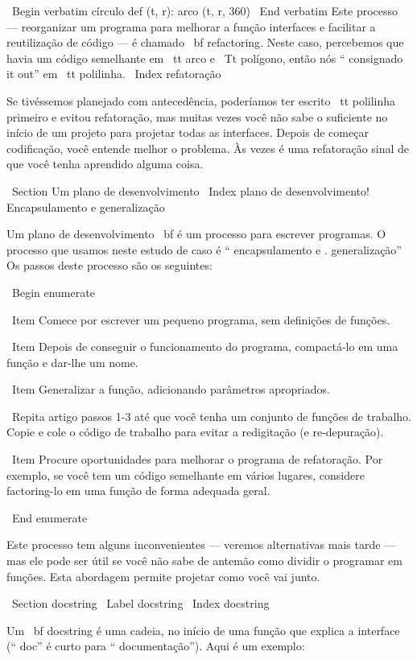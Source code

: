 \documentclass[10pt]{book}
\begin{document}
{\ Begin {verbatim}
círculo def (t, r):
    arco (t, r, 360)
\ End {verbatim}
%
Este processo --- reorganizar um programa para melhorar a função
interfaces e facilitar a reutilização de código --- é chamado {\ bf refactoring}.
Neste caso, percebemos que havia um código semelhante em {\ tt arco} e
{\ Tt polígono}, então nós `` consignado it out'' em {\ tt polilinha}.
\ Index {} refatoração

Se tivéssemos planejado com antecedência, poderíamos ter escrito {\ tt polilinha} primeiro
e evitou refatoração, mas muitas vezes você não sabe o suficiente no
início de um projeto para projetar todas as interfaces. Depois de começar
codificação, você entende melhor o problema. Às vezes é uma refatoração
sinal de que você tenha aprendido alguma coisa.


\ Section {Um plano de desenvolvimento}
\ Index {plano de desenvolvimento! Encapsulamento e generalização}

Um plano de desenvolvimento {\ bf} é um processo para escrever programas.
O processo que usamos
neste estudo de caso é `` encapsulamento e
. generalização'' Os passos deste processo são os seguintes:

\ Begin {enumerate}

\ Item Comece por escrever um pequeno programa, sem definições de funções.

\ Item Depois de conseguir o funcionamento do programa, compactá-lo em uma função
e dar-lhe um nome.

\ Item Generalizar a função, adicionando parâmetros apropriados.

\ Repita artigo passos 1-3 até que você tenha um conjunto de funções de trabalho.
Copie e cole o código de trabalho para evitar a redigitação (e re-depuração).

\ Item Procure oportunidades para melhorar o programa de refatoração.
Por exemplo, se você tem um código semelhante em vários lugares, considere
factoring-lo em uma função de forma adequada geral.

\ End {enumerate}

Este processo tem alguns inconvenientes --- veremos alternativas mais tarde --- mas
ele pode ser útil se você não sabe de antemão como dividir o
programar em funções. Esta abordagem permite projetar como você vai
junto.


\ Section {} docstring
\ Label {} docstring
\ Index {} docstring

Um {\ bf docstring} é uma cadeia, no início de uma função que
explica a interface (`` doc'' é curto para `` documentação''). Aqui
é um exemplo:

}
\end{document}
